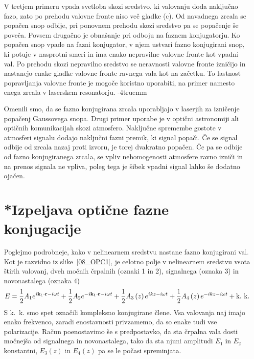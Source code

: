 V tretjem primeru vpada svetloba skozi sredstvo, ki valovanju doda naključno
fazo, zato po prehodu valovne fronte niso več gladke (c). Od navadnega zrcala
se popačen snop odbije, pri ponovnem prehodu skozi sredstvo pa se popačenje
še poveča. Povsem drugačno je obnašanje pri odboju na faznem konjugatorju. 
Ko popačen snop vpade na fazni konjugator, v njem ustvari fazno konjugirani snop, 
ki potuje v nasprotni smeri in ima enako nepravilne valovne fronte kot vpadni val. Po prehodu
skozi nepravilno sredstvo se neravnosti valovne fronte izničijo
in nastanejo enake gladke valovne fronte ravnega vala kot na začetku. 
To lastnost popravljanja valovne fronte je mogoče 
koristno uporabiti, na primer namesto enega zrcala v laserskem resonatorju.
\vglue-4truemm
\begin{remark}
Omenili smo, da se fazno konjugirana zrcala uporabljajo v laserjih za izničenje
popačenj Gaussovega snopa. Drugi primer uporabe je v optični astronomiji
ali optičnih komunikacijah skozi atmosfero. Naključne spremembe gostote v atmosferi
signalu dodajo naključni fazni premik, ki signal popači. Če se signal odbije od zrcala nazaj
proti izvoru, je torej dvakratno popačen. Če pa se odbije od fazno konjugiranega zrcala, 
se vpliv nehomogenosti atmosfere ravno izniči in na prenos signala ne vpliva, poleg
tega je šibek vpadni signal lahko še dodatno ojačen. 
\end{remark}

\section{*Izpeljava optične fazne konjugacije}
Poglejmo podrobneje, kako v nelinearnem sredstvu nastane fazno konjugirani
val. Kot je razvidno iz slike~\ref{08_OPC1}, je celotno polje v nelinearnem
sredstvu vsota štirih valovanj, dveh močnih črpalnih (oznaki 1 in 2), signalnega 
(oznaka 3) in novonastalega (oznaka 4)
\begin{equation}
E=\frac{1}{2}A_{1}e^{i{\bf k}_{1}\cdot{\bf r}-i\omega t}+\frac{1}{2}A_{2}e^{-i{\bf k}_{1}\cdot{\bf r}-
i\omega t}+\frac{1}{2}A_{3}\left(z\right)e^{ikz-i\omega t}+\frac{1}{2}A_{4}
\left(z\right)e^{-ikz-i\omega t}+\mathrm{k.~k.}
\label{8.99}
\end{equation}
S k.~k. smo spet označili kompleksno konjugirane člene.  Vsa valovanja naj imajo
enako frekvenco, zaradi enostavnosti privzamemo, da so enake tudi vse polarizacije.
Račun poenostavimo še s predpostavko, da sta črpalna vala dosti močnejša 
od signalnega in novonastalega, tako da sta njuni
amplitudi $E_{1}$ in $E_{2}$ konstantni, $E_{3}\left(z\right)$ in $E_{4}\left(z\right)$
pa se le počasi spreminjata.

